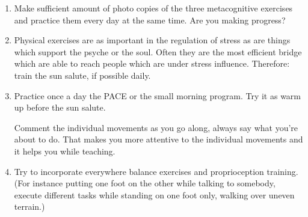 \documentclass[../main.tex]{subfiles}
\begin{document}
  \begin{enumerate}[label = \Alph*]
  \item Make sufficient amount of photo copies of the three metacognitive exercises and practice them every day at the same time. Are you making progress?
  \item Physical exercises are as important in the regulation of stress as are things which support the psyche or the soul.
    Often they are the most efficient bridge which are able to reach people which are under stress influence.
    Therefore: train the sun salute, if possible daily.
  \item Practice once a day the PACE or the small morning program.
    Try it as warm up before the sun salute.

    Comment the individual movements as you go along, always say what you're about to do. That makes you more attentive to the individual movements and it helps you while teaching.

  \item Try to incorporate everywhere balance exercises and proprioception training.
    (For instance putting one foot on the other while talking to somebody, 
    execute different tasks while standing on one foot only,
    walking over uneven terrain.)
    \end{enumerate}
\end{document}
